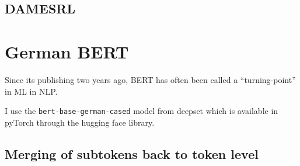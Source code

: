 \subsection{DAMESRL}

\section{German BERT}

Since its publishing two years ago, BERT \citep{devlin2018bert} has often been called a ``turning-point'' in ML in NLP.

I use the \texttt{bert-base-german-cased} model from deepset which is available in pyTorch through the hugging face library\cite{wolf2019transformers}.

\subsection{Merging of subtokens back to token level}

